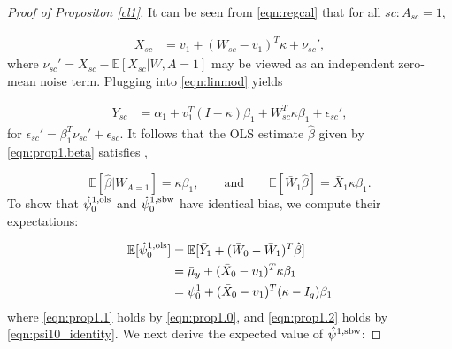 \begin{proof}[Proof of Propositon \ref{cl1}]
It can be seen from \eqref{eqn:regcal} that for all $sc: A_{sc}=1$,

\begin{align*}
   X_{sc} &= v_1 + (W_{sc} - v_1)^T \kappa + \nu_{sc}',
\end{align*}
where $\nu_{sc}' = X_{sc} - \mathbb{E}[X_{sc}|W,A=1]$ may be viewed as an independent zero-mean noise term. Plugging into \eqref{eqn:linmod} yields 

\begin{align*}
   Y_{sc} & = \alpha_1 + v_1^T (I - \kappa)\beta_1 + W_{sc}^T \kappa \beta_1 + \epsilon_{sc}',
\end{align*}
for $\epsilon_{sc}' = \beta_1^T\nu_{sc}' + \epsilon_{sc}$. It follows that the OLS estimate $\hat{\beta}$ given by \eqref{eqn:prop1.beta} satisfies \citep{gleser1992importance},

\begin{equation}\label{eqn:prop1.0}
\mathbb{E}[\hat{\beta}|W_{A=1}] = \kappa \beta_1, \qquad \text{and} \qquad \mathbb{E}[\bar{W}_1 \hat{\beta}] = \bar{X}_1 \kappa \beta_1.
\end{equation}
To show that $\hat{\psi}_0^{1,\textup{ols}}$ and $\hat{\psi}_0^{1, \textup{sbw}}$ have identical bias, we compute their expectations:

\begin{align}
\nonumber	\mathbb{E}[\hat{\psi}_0^{1,\textup{ols}}] &= \mathbb{E}[ \bar{Y}_1 + (\bar{W}_0 - \bar{W}_1)^T \hat{\beta}] \\
	& = \bar{\mu}_y + (\bar{X}_0 - \upsilon_1)^T\kappa\beta_1 \label{eqn:prop1.1}\\
	& = \psi_0^1 + (\bar{X}_0 - \upsilon_1)^T(\kappa - I_q)\beta_1 \label{eqn:prop1.2}
\end{align}
where \eqref{eqn:prop1.1} holds by \eqref{eqn:prop1.0}, and \eqref{eqn:prop1.2} holds by \eqref{eqn:psi10_identity}. We next derive the expected value of $\hat{\psi}^{1, \textup{sbw}}$:


\end{proof}
